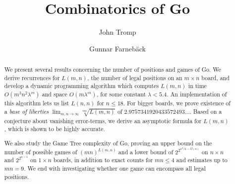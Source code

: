 \documentclass{article}
\begin{document}
\newtheorem{theorem}{\sc Theorem}
\newtheorem{lemma}{\sc Lemma}
\newtheorem{coro}{\sc Corollary}
\newtheorem{conj}{\sc Conjecture}
\newtheorem{defin}{\sc Definition}
\newenvironment{proof}{\par \sc Proof.\rm}{\hspace*{\fill}$\bullet$\vspace{1ex}}
\newcommand{\BFL}{\mathbf{L}}
\newcommand{\BFl}{\mathbf{l}}
\newcommand{\BFp}{\mathbf{p}}
\newcommand{\BFT}{\mathbf{T}}

\title{Combinatorics of Go}

\author{John Tromp \and Gunnar Farneb\"{a}ck}

\maketitle

\begin{abstract}
We present several results concerning
the number of positions and games of Go.
We derive recurrences for $L(m,n)$,
the number of legal positions on an $m \times n$ board,
and develop a dynamic programming algorithm which computes
$L(m,n)$ in time $O(m^3 n^2 \lambda^m)$ and space $O(m \lambda^m)$,
for some constant $\lambda < 5.4$.
An implementation of this algorithm lets us list $L(n,n)$ for $n\leq 18$.
For bigger boards, we prove existence of a
{\em base of liberties} $\lim_{m,n \rightarrow \infty} \sqrt[mn]{L(m,n)}$ of
$2.9757341920433572493\ldots$.
Based on a conjecture about vanishing error-terms,
we derive an asymptotic formula for $L(m,n)$,
which is shown to be highly accurate.

We also study the Game Tree complexity of Go,
proving an upper bound on the number of possible games
of $(mn)^{L(m,n)}$ and a lower bound
of $2^{2^{n^2/2\,-O(n)}}$ on $n\times n$ and $2^{2^{n-1}}$
on $1 \times n$ boards, in addition to
exact counts for $mn \leq 4$ and estimates up to $mn=9$.
We end with investigating whether one game can encompass all legal positions.
\end{abstract}
\end{document}
